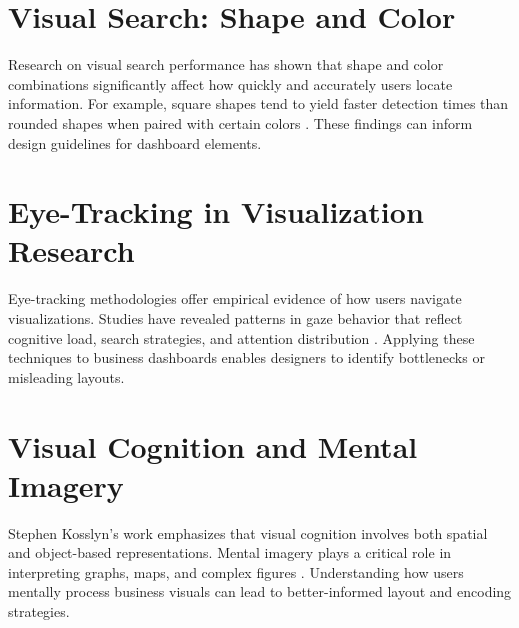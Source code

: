 \documentclass[12pt]{article}
\begin{document}
\section{Visual Search: Shape and Color}
Research on visual search performance has shown that shape and color combinations significantly affect how quickly and accurately users locate information. For example, square shapes tend to yield faster detection times than rounded shapes when paired with certain colors \parencite{abdurrahman2023}. These findings can inform design guidelines for dashboard elements.

\section{Eye-Tracking in Visualization Research}
Eye-tracking methodologies offer empirical evidence of how users navigate visualizations. Studies have revealed patterns in gaze behavior that reflect cognitive load, search strategies, and attention distribution \parencite{burch2017}. Applying these techniques to business dashboards enables designers to identify bottlenecks or misleading layouts.

\section{Visual Cognition and Mental Imagery}
Stephen Kosslyn's work emphasizes that visual cognition involves both spatial and object-based representations. Mental imagery plays a critical role in interpreting graphs, maps, and complex figures \parencite{kosslyn1994}. Understanding how users mentally process business visuals can lead to better-informed layout and encoding strategies.

\printbibliography
\end{document}
